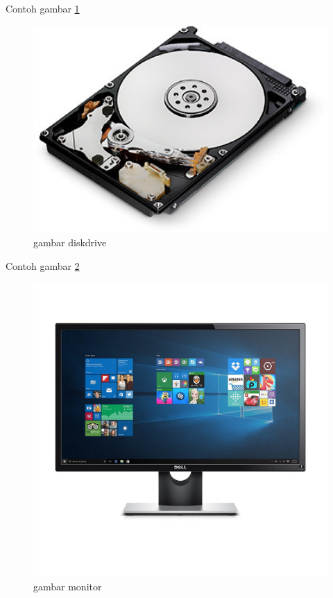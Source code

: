 Contoh gambar 
\ref{diskdrive.jpg}
\begin{figure}[ht]
\centerline{\includegraphics[width=1\textwidth]{figures/diskdrive.jpg}}
\caption{gambar diskdrive}
\label{diskdrive.jpg}
\end{figure}

Contoh gambar \ref{monitor.jpg} 

\begin{figure}[ht]
\centerline{\includegraphics[width=1\textwidth]{figures/monitor.jpg}}
\caption{gambar monitor}
\label{monitor.jpg}
\end{figure}

